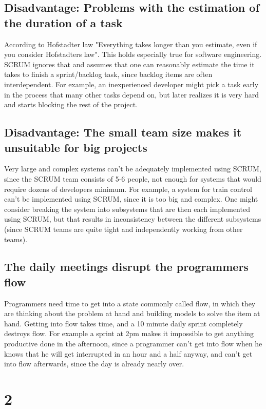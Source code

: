 \documentclass[11pt,a4paper]{article}
\begin{document}
\subsection*{Disadvantage: Problems with the estimation of the duration of a task}

According to Hofstadter law "Everything takes longer than you estimate,
even if you consider Hofstadters law". This holds especially true
for software engineering. SCRUM ignores that and assumes that one
can reasonably estimate the time it takes to finish a sprint/backlog
task, since backlog items are often interdependent. For example, an
inexperienced developer might pick a task early in the process that many
other tasks depend on, but later realizes it is very hard and starts
blocking the rest of the project.

\subsection*{Disadvantage: The small team size makes it unsuitable for big projects}

Very large and complex systems can't be adequately implemented using
SCRUM, since the SCRUM team consists of 5-6 people, not enough for
systems that would require dozens of developers minimum. For example,
a system for train control can't be implemented using SCRUM, since it
is too big and complex. One might consider breaking the system into
subsystems that are then each implemented using SCRUM, but that results
in inconsistency between the different subsystems (since SCRUM teams
are quite tight and independently working from other teams).

\subsection*{The daily meetings disrupt the programmers flow}

Programmers need time to get into a state commonly called flow,
in which they are thinking about the problem at hand and building
models to solve the item at hand. Getting into flow takes time,
and a 10 minute daily sprint completely destroys flow. For example
a sprint at 2pm makes it impossible to get anything productive done
in the afternoon, since a programmer can't get into flow when he
knows that he will get interrupted in an hour and a half anyway,
and can't get into flow afterwards, since the day is already nearly
over.

\section*{2}
\end{document}
